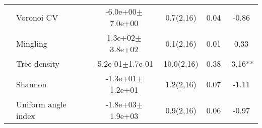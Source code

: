 \begin{table}[ht]
\begin{tabular}{llcccS[table-format=-2.2, table-space-text-post = {***}]}
   & Voronoi CV & -6.0e+00$\pm$7.0e+00 & 0.7(2,16) & 0.04 & -0.86 \\ 
   & Mingling &  1.3e+02$\pm$3.8e+02 & 0.1(2,16) & 0.01 & 0.33 \\ 
   & Tree density & -5.2e-01$\pm$1.7e-01 & 10.0(2,16) & 0.38 & -3.16** \\ 
   & Shannon & -1.3e+01$\pm$1.2e+01 & 1.2(2,16) & 0.07 & -1.11 \\ 
   & Uniform angle index & -1.8e+03$\pm$1.9e+03 & 0.9(2,16) & 0.06 & -0.97 \\ 
   \bottomrule
\end{tabular}
\end{table}

